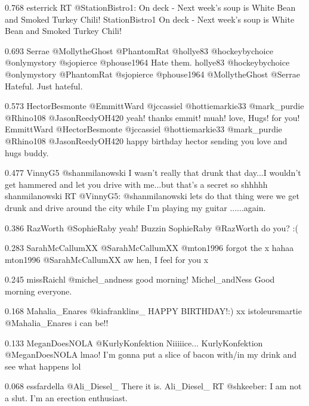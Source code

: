 {0.768}
{\joinNameTweet
{esterrick}
{RT @StationBistro1: On deck - Next week's soup is White Bean and Smoked Turkey Chili!}}
{\joinNameTweet
{StationBistro1}
{On deck - Next week's soup is White Bean and Smoked Turkey Chili!}}

{0.693}
{\joinNameTweet
{Serrae}
{@MollytheGhost @PhantomRat @hollye83 @hockeybychoice @onlymystory @sjopierce @phouse1964 Hate them.}}
{\joinNameTweet
{hollye83}
{@hockeybychoice @onlymystory @PhantomRat @sjopierce @phouse1964 @MollytheGhost @Serrae Hateful. Just hateful.}}

{0.573}
{\joinNameTweet
{HectorBesmonte}
{@EmmittWard @jccassiel @hottiemarkie33 @mark\_purdie @Rhino108 @JasonReedyOH420 yeah! thanks emmit! muah! love, Hugs! for you!}}
{\joinNameTweet
{EmmittWard}
{@HectorBesmonte @jccassiel @hottiemarkie33 @mark\_purdie @Rhino108 @JasonReedyOH420 happy birthday hector sending you love and hugs buddy.}}

{0.477}
{\joinNameTweet
{VinnyG5}
{@shanmilanowski I wasn't really that drunk that day...I wouldn't get hammered and let you drive with me...but that's a secret so shhhhh}}
{\joinNameTweet
{shanmilanowski}
{RT @VinnyG5: @shanmilanowski lets do that thing were we get drunk and drive around the city while I'm playing my guitar ......again.}}

{0.386}
{\joinNameTweet
{RazWorth}
{@SophieRaby yeah! Buzzin}}
{\joinNameTweet
{SophieRaby}
{@RazWorth do you? :(}}

{0.283}
{\joinNameTweet
{SarahMcCallumXX}
{@SarahMcCallumXX @mton1996 forgot the x hahaa}}
{\joinNameTweet
{mton1996}
{@SarahMcCallumXX aw hen, I feel for you x}}

{0.245}
{\joinNameTweet
{missRaichl}
{@michel\_andness good morning!}}
{\joinNameTweet
{Michel\_andNess}
{Good morning everyone.}}

{0.168}
{\joinNameTweet
{Mahalia\_Enares}
{@kiafranklins\_ HAPPY BIRTHDAY!:) xx}}
{\joinNameTweet
{istoleursmartie}
{@Mahalia\_Enares i can be!!}}

{0.133}
{\joinNameTweet
{MeganDoesNOLA}
{@KurlyKonfektion Niiiiice...}}
{\joinNameTweet
{KurlyKonfektion}
{@MeganDoesNOLA lmao! I'm gonna put a slice of bacon with/in my drink and see what happens lol}}

{0.068}
{\joinNameTweet
{essfardella}
{@Ali\_Diesel\_ There it is.}}
{\joinNameTweet
{Ali\_Diesel\_}
{RT @shkeeber: I am not a slut.    I'm an erection enthusiast.}}